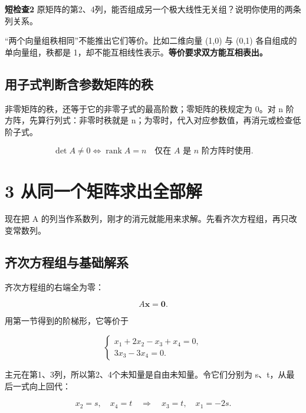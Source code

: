 \documentclass[
  11pt,
  a4paper,
  fontset=fandol]{ctexart}
\begin{document}
\textbf{短检查2}
原矩阵的第2、4列，能否组成另一个极大线性无关组？说明你使用的两条列关系。

``两个向量组秩相同''不能推出它们等价。比如二维向量 (1,0) 与 (0,1)
各自组成的单向量组，秩都是
1，却不能互相线性表示。\textbf{等价要求双方能互相表出。}


\subsection{用子式判断含参数矩阵的秩}\label{ux7528ux5b50ux5f0fux5224ux65adux542bux53c2ux6570ux77e9ux9635ux7684ux79e9}

非零矩阵的秩，还等于它的非零子式的最高阶数；零矩阵的秩规定为 0。对 n
阶方阵，先算行列式：非零时秩就是
n；为零时，代入对应参数值，再消元或检查低阶子式。

\[\det A\ne0\Longleftrightarrow\operatorname{rank}A=n
\quad\text{仅在 }A\text{ 是 }n\text{ 阶方阵时使用}.\]


\section{3
从同一个矩阵求出全部解}\label{3-ux4eceux540cux4e00ux4e2aux77e9ux9635ux6c42ux51faux5168ux90e8ux89e3}

现在把 A
的列当作系数列，刚才的消元就能用来求解。先看齐次方程组，再只改变常数列。


\subsection{齐次方程组与基础解系}\label{ux9f50ux6b21ux65b9ux7a0bux7ec4ux4e0eux57faux7840ux89e3ux7cfb}

齐次方程组的右端全为零：

\[A\boldsymbol x=\boldsymbol0.\]

用第一节得到的阶梯形，它等价于

\[\begin{cases}
x_1+2x_2-x_3+x_4=0,\\
3x_3-3x_4=0.
\end{cases}\]

主元在第1、3列，所以第2、4个未知量是自由未知量。令它们分别为
s、t，从最后一式向上回代：

\[x_2=s,\quad x_4=t
\quad\Longrightarrow\quad
x_3=t,\quad x_1=-2s.\]
\end{document}
